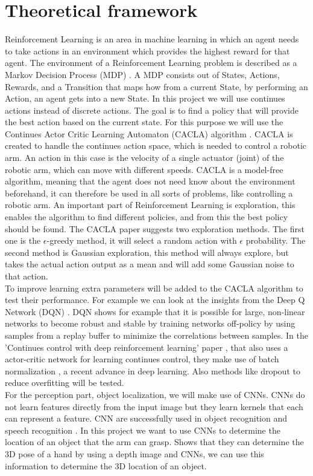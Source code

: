 \section{Theoretical framework}
Reinforcement Learning is an area in machine learning in which an agent needs to take actions in an environment which provides the highest reward for that agent. The environment of a Reinforcement Learning problem
is described as a Markov Decision Process (MDP) \cite{markov}. A MDP consists out of States, Actions, Rewards, and a Transition that maps how from a current State, by performing an Action, an agent gets into a new State. In this project
we will use continues actions instead of discrete actions. The goal is to find a policy that will provide the best action based on the current state. 
For this purpose we will use the Continues Actor Critic Learning Automaton (CACLA) algorithm \cite{van2007reinforcement}. CACLA is created to handle the continues action space, which is needed to control a robotic arm. An action in this case is the velocity of a single actuator (joint) of the 
robotic arm, which can move with different speeds. CACLA is a model-free algorithm, meaning that the agent does not need know about the environment beforehand, it can therefore be used in all sorts of problems, like controlling a 
robotic arm. An important part of Reinforcement Learning is exploration, this enables the algorithm to find different policies, and from this the best policy should be found. 
The CACLA paper suggests two exploration methods. The first one is the $\epsilon$-greedy method, it will select a random action with $\epsilon$ probability. The second method is Gaussian exploration,
this method will always explore, but takes the actual action output as a mean and will add some Gaussian noise to that action. \\
To improve learning extra parameters will be added to the CACLA algorithm to test their performance. For example we can look at the insights from the Deep Q Network (DQN) \cite{mnih2015human}. DQN shows for example that it is possible for 
large, non-linear networks to become robust and stable by training networks off-policy by using samples from a replay buffer to minimize the correlations between samples. In the 'Continues control with deep reinforcement learning' paper
\cite{lillicrap2015continuous}, that also uses a actor-critic network for learning continues control, they make use of 
batch normalization \cite{ioffe2015batch}, a recent advance in deep learning. Also methods like dropout \cite{srivastava2014dropout} to reduce overfitting will be tested. \\
For the perception part, object localization, we will make use of CNNs. CNNs do not learn features directly from the input image but they learn kernels that each can represent a feature. CNN are successfully used in 
object recognition and speech recognition \cite{sainath2015deep}. In this project we want to use CNNs to determine the location of an object that the arm can grasp. \cite{oberweger2015hands} Shows that they can determine the 3D pose of a hand by using 
a depth image and CNNs, we can use this information to determine the 3D location of an object.

 
